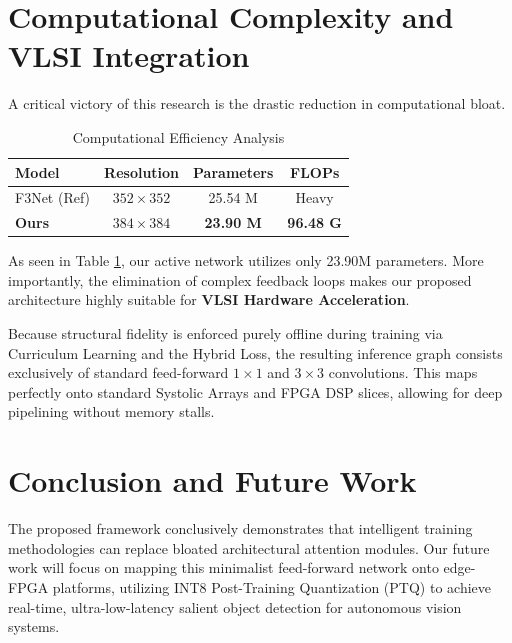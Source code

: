 \documentclass[10pt,conference,twocolumn]{IEEEtran}
\begin{document}
\section{Computational Complexity and VLSI Integration}
A critical victory of this research is the drastic reduction in computational bloat. 

\begin{table}[htbp]
\caption{Computational Efficiency Analysis}
\begin{center}
\begin{tabular}{lccc}
\toprule
\textbf{Model} & \textbf{Resolution} & \textbf{Parameters} & \textbf{FLOPs} \\
\midrule
F3Net (Ref) & $352 \times 352$ & 25.54 M & Heavy \\
\textbf{Ours} & $384 \times 384$ & \textbf{23.90 M} & \textbf{96.48 G} \\
\bottomrule
\end{tabular}
\label{tab:flops}
\end{center}
\end{table}

As seen in Table \ref{tab:flops}, our active network utilizes only 23.90M parameters. More importantly, the elimination of complex feedback loops makes our proposed architecture highly suitable for \textbf{VLSI Hardware Acceleration}. 

Because structural fidelity is enforced purely offline during training via Curriculum Learning and the Hybrid Loss, the resulting inference graph consists exclusively of standard feed-forward $1\times1$ and $3\times3$ convolutions. This maps perfectly onto standard Systolic Arrays and FPGA DSP slices, allowing for deep pipelining without memory stalls.

\section{Conclusion and Future Work}
The proposed framework conclusively demonstrates that intelligent training methodologies can replace bloated architectural attention modules. Our future work will focus on mapping this minimalist feed-forward network onto edge-FPGA platforms, utilizing INT8 Post-Training Quantization (PTQ) to achieve real-time, ultra-low-latency salient object detection for autonomous vision systems.
\end{document}
